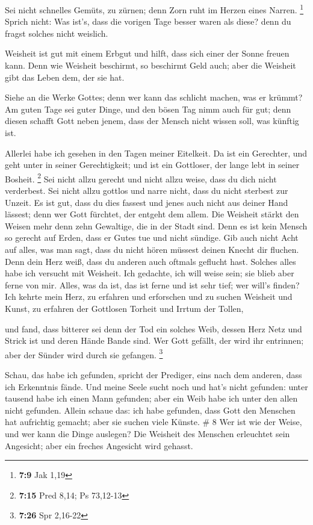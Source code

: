 Sei nicht schnelles Gemüts, zu zürnen; denn Zorn ruht im
Herzen eines Narren. \footnote{\textbf{7:9} Jak 1,19} 
Sprich nicht: Was ist's, dass die vorigen Tage besser waren als diese?
denn du fragst solches nicht weislich.

 Weisheit ist gut mit einem Erbgut und hilft, dass sich
einer der Sonne freuen kann.  Denn wie Weisheit
beschirmt, so beschirmt Geld auch; aber die Weisheit gibt das Leben dem,
der sie hat.

 Siehe an die Werke Gottes; denn wer kann das schlicht
machen, was er krümmt?  Am guten Tage sei guter Dinge,
und den bösen Tag nimm auch für gut; denn diesen schafft Gott neben
jenem, dass der Mensch nicht wissen soll, was künftig ist.

 Allerlei habe ich gesehen in den Tagen meiner Eitelkeit.
Da ist ein Gerechter, und geht unter in seiner Gerechtigkeit; und ist
ein Gottloser, der lange lebt in seiner Bosheit. \footnote{\textbf{7:15}
  Pred 8,14; Ps 73,12-13}  Sei nicht allzu gerecht und
nicht allzu weise, dass du dich nicht verderbest.  Sei
nicht allzu gottlos und narre nicht, dass du nicht sterbest zur Unzeit.
 Es ist gut, dass du dies fassest und jenes auch nicht
aus deiner Hand lässest; denn wer Gott fürchtet, der entgeht dem allem.
 Die Weisheit stärkt den Weisen mehr denn zehn Gewaltige,
die in der Stadt sind.  Denn es ist kein Mensch so
gerecht auf Erden, dass er Gutes tue und nicht sündige. 
Gib auch nicht Acht auf alles, was man sagt, dass du nicht hören müssest
deinen Knecht dir fluchen.  Denn dein Herz weiß, dass du
anderen auch oftmals geflucht hast.  Solches alles habe
ich versucht mit Weisheit. Ich gedachte, ich will weise sein; sie blieb
aber ferne von mir.  Alles, was da ist, das ist ferne und
ist sehr tief; wer will's finden?  Ich kehrte mein Herz,
zu erfahren und erforschen und zu suchen Weisheit und Kunst, zu erfahren
der Gottlosen Torheit und Irrtum der Tollen,

 und fand, dass bitterer sei denn der Tod ein solches
Weib, dessen Herz Netz und Strick ist und deren Hände Bande sind. Wer
Gott gefällt, der wird ihr entrinnen; aber der Sünder wird durch sie
gefangen. \footnote{\textbf{7:26} Spr 2,16-22}

 Schau, das habe ich gefunden, spricht der Prediger, eins
nach dem anderen, dass ich Erkenntnis fände.  Und meine
Seele sucht noch und hat's nicht gefunden: unter tausend habe ich einen
Mann gefunden; aber ein Weib habe ich unter den allen nicht gefunden.
 Allein schaue das: ich habe gefunden, dass Gott den
Menschen hat aufrichtig gemacht; aber sie suchen viele Künste. \# 8
 Wer ist wie der Weise, und wer kann die Dinge auslegen?
Die Weisheit des Menschen erleuchtet sein Angesicht; aber ein freches
Angesicht wird gehasst.

